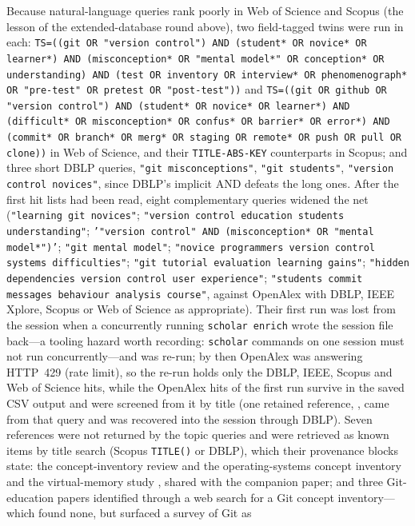 Because natural-language queries rank poorly in Web of Science and
Scopus (the lesson of the extended-database round above), two
field-tagged twins were run in each:
\texttt{TS=((git OR "version control") AND (student* OR novice* OR
learner*) AND (misconception* OR "mental model*" OR conception* OR
understanding) AND (test OR inventory OR interview* OR phenomenograph* OR
"pre-test" OR pretest OR "post-test"))} and
\texttt{TS=((git OR github OR "version control") AND (student* OR
novice* OR learner*) AND (difficult* OR misconception* OR confus* OR
barrier* OR error*) AND (commit* OR branch* OR merg* OR staging OR
remote* OR push OR pull OR clone))} in Web of Science, and their
\texttt{TITLE-ABS-KEY} counterparts in Scopus; and three short DBLP
queries, \texttt{"git misconceptions"}, \texttt{"git students"},
\texttt{"version control novices"}, since DBLP's implicit AND defeats the
long ones.
After the first hit lists had been read, eight complementary queries
widened the net (\texttt{"learning git novices"}; \texttt{"version
control education students understanding"}; \texttt{'"version control"
AND (misconception* OR "mental model*")'}; \texttt{"git mental model"};
\texttt{"novice programmers version control systems difficulties"};
\texttt{"git tutorial evaluation learning gains"}; \texttt{"hidden
dependencies version control user experience"}; \texttt{"students commit
messages behaviour analysis course"}, against OpenAlex with DBLP, IEEE
Xplore, Scopus or Web of Science as appropriate).
Their first run was lost from the session when a concurrently running
\texttt{scholar enrich} wrote the session file back---a tooling hazard
worth recording: \texttt{scholar} commands on one session must not run
concurrently---and was re-run; by then OpenAlex was answering
HTTP~429 (rate limit), so the re-run holds only the DBLP, IEEE, Scopus
and Web of Science hits, while the OpenAlex hits of the first run
survive in the saved CSV output and were screened from it by title (one
retained reference, \textcite{Church2014HiddenDependencies}, came from
that query and was recovered into the session through DBLP).
Seven references were not returned by the topic queries and were
retrieved as known items by title search (Scopus \texttt{TITLE()} or
DBLP), which their provenance blocks state: the concept-inventory review
and the operating-systems concept inventory
\autocite{Taylor2014CI,WebbTaylor2014OSCI} and the virtual-memory study
\autocite{Pamplona2024VirtualMemory}, shared with the companion paper;
and three Git-education papers identified through a web search for a
Git concept inventory---which found none, but surfaced a survey of Git as

